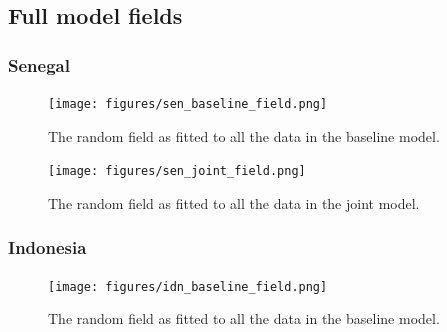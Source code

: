 \documentclass[10pt,a4]{article}
\begin{document}
\clearpage

\subsection{Full model fields}


\subsubsection{Senegal}




\begin{figure}[h!]
\centering

\texttt{[image: figures/sen\_baseline\_field.png]}

\caption{The random field as fitted to all the data in the baseline model.}
\label{baselinefieldsen}
\end{figure}


\begin{figure}[h!]
     \centering
     \label{gpsencov}
\end{figure}


\begin{figure}[h!]
\centering

\texttt{[image: figures/sen\_joint\_field.png]}

\caption{The random field as fitted to all the data in the joint model.}
\label{jointfieldsen}
\end{figure}




\clearpage
\subsubsection{Indonesia}




\begin{figure}[h!]
\centering

\texttt{[image: figures/idn\_baseline\_field.png]}

\caption{The random field as fitted to all the data in the baseline model.}
\label{baselinefieldidn}
\end{figure}



\begin{figure}[h!]
     \centering
     \label{gpsencov}
\end{figure}
\end{document}
